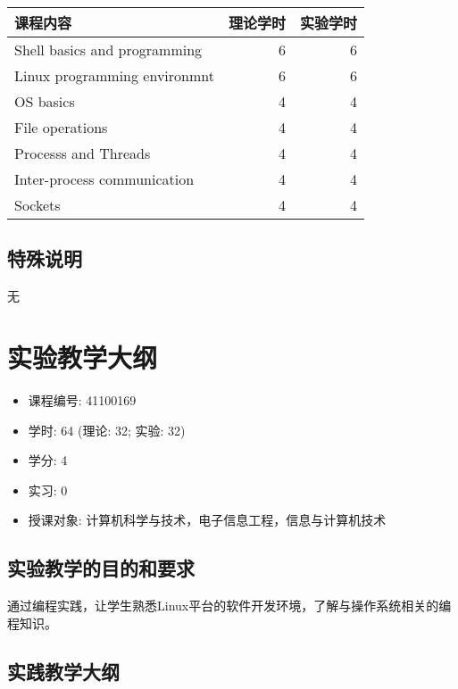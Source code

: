 \documentclass{wx672ctexart}
\begin{document}
\begin{center}
  \begin{tabular}{lrr}
    \hline
    课程内容 & 理论学时 & 实验学时\\
    \hline
    Shell basics and programming&6&6\\
    Linux programming environmnt&6&6\\
    OS basics                   &4&4\\
    File operations             &4&4\\
    Processs and Threads        &4&4\\
    Inter-process communication &4&4\\
    Sockets                     &4&4\\    
    \hline
  \end{tabular}
\end{center}

\subsection{特殊说明}
\label{sec-2-6}

无

\section{实验教学大纲}
\label{sec:lab}

\begin{itemize}
\item 课程编号: 41100169
\item 学时: 64 (理论: 32; 实验: 32)
\item 学分: 4
\item 实习: 0
\item 授课对象: 计算机科学与技术，电子信息工程，信息与计算机技术
\end{itemize}

\subsection{实验教学的目的和要求}
\label{sec-3-1}

通过编程实践，让学生熟悉Linux平台的软件开发环境，了解与操作系统相关的编程知识。

\subsection{实践教学大纲}
\label{sec-3-2}
\end{document}
